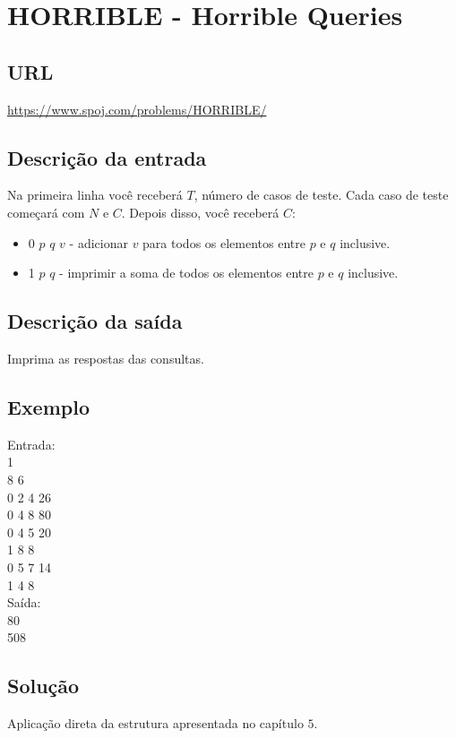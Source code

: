 \section{HORRIBLE - Horrible Queries}
\subsection{URL}
\url{https://www.spoj.com/problems/HORRIBLE/}

\subsection{Descrição da entrada}
Na primeira linha você receberá $T$, número de casos de teste.
Cada caso de teste começará com $N$ e $C$. Depois disso, você receberá $C$:
\begin{itemize}
    \item 0 $p$ $q$ $v$ - adicionar $v$ para todos os elementos entre $p$ e $q$ inclusive.
    \item 1 $p$ $q$ - imprimir a soma de todos os elementos entre $p$ e $q$ inclusive.
\end{itemize}
\subsection{Descrição da saída}
Imprima as respostas das consultas.
\subsection{Exemplo}
Entrada:\\
1\\
8 6\\
0 2 4 26\\
0 4 8 80\\
0 4 5 20\\
1 8 8 \\
0 5 7 14\\
1 4 8\\

Saída:\\
80\\
508\\

\subsection{Solução}

Aplicação direta da estrutura apresentada no capítulo $5$.